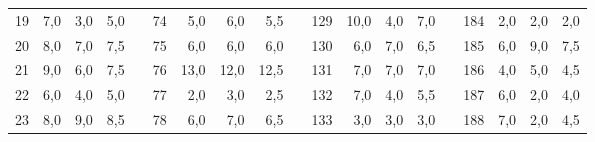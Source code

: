 \begin{table}[H]
{\begin{tabular}{|c|r|r|r|l|c|r|r|r|l|c|r|r|r|lcrrr}
19                                                    & 7,0                                                                       & 3,0                                                                       & 5,0                                                                       &  & 74  & 5,0  & 6,0  & 5,5  &  & 129 & 10,0 & 4,0  & 7,0  & \multicolumn{1}{l|}{} & \multicolumn{1}{c|}{184} & \multicolumn{1}{r|}{2,0}  & \multicolumn{1}{r|}{2,0}  & \multicolumn{1}{r|}{2,0}  \\ \cline{1-4} \cline{6-9} \cline{11-14} \cline{16-19} 
20                                                    & 8,0                                                                       & 7,0                                                                       & 7,5                                                                       &  & 75  & 6,0  & 6,0  & 6,0  &  & 130 & 6,0  & 7,0  & 6,5  & \multicolumn{1}{l|}{} & \multicolumn{1}{c|}{185} & \multicolumn{1}{r|}{6,0}  & \multicolumn{1}{r|}{9,0}  & \multicolumn{1}{r|}{7,5}  \\ \cline{1-4} \cline{6-9} \cline{11-14} \cline{16-19} 
21                                                    & 9,0                                                                       & 6,0                                                                       & 7,5                                                                       &  & 76  & 13,0 & 12,0 & 12,5 &  & 131 & 7,0  & 7,0  & 7,0  & \multicolumn{1}{l|}{} & \multicolumn{1}{c|}{186} & \multicolumn{1}{r|}{4,0}  & \multicolumn{1}{r|}{5,0}  & \multicolumn{1}{r|}{4,5}  \\ \cline{1-4} \cline{6-9} \cline{11-14} \cline{16-19} 
22                                                    & 6,0                                                                       & 4,0                                                                       & 5,0                                                                       &  & 77  & 2,0  & 3,0  & 2,5  &  & 132 & 7,0  & 4,0  & 5,5  & \multicolumn{1}{l|}{} & \multicolumn{1}{c|}{187} & \multicolumn{1}{r|}{6,0}  & \multicolumn{1}{r|}{2,0}  & \multicolumn{1}{r|}{4,0}  \\ \cline{1-4} \cline{6-9} \cline{11-14} \cline{16-19} 
23                                                    & 8,0                                                                       & 9,0                                                                       & 8,5                                                                       &  & 78  & 6,0  & 7,0  & 6,5  &  & 133 & 3,0  & 3,0  & 3,0  & \multicolumn{1}{l|}{} & \multicolumn{1}{c|}{188} & \multicolumn{1}{r|}{7,0}  & \multicolumn{1}{r|}{2,0}  & \multicolumn{1}{r|}{4,5}  \\ \cline{1-4} \cline{6-9} \cline{11-14} \cline{16-19} 

\end{tabular}}
\end{table}
